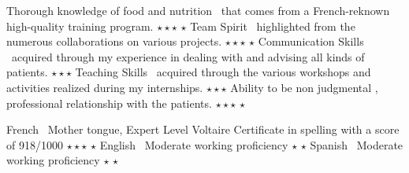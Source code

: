 
\vspace{0.5cm}

\begin{cvhonors}
  \cvhonor
    {Thorough knowledge of food and nutrition}
    {~that comes from a French-reknown high-quality training program.}
    {$\star\star\star$ $\star$}
  \cvhonor
    {Team Spirit}
    {~highlighted from the numerous collaborations on various projects.}
    {$\star\star\star$ $\star$}    
  \cvhonor
    {Communication Skills}
    {~acquired through my experience in dealing with and advising all kinds of patients.}
    {$\star\star\star$}
  \cvhonor
    {Teaching Skills}
    {~acquired through the various workshops and activities realized during my internships.}
    {$\star\star\star$}
  \cvhonor
    {Ability to be non judgmental}
    {, professional relationship with the patients.}
    {$\star\star\star$ $\star$}
\end{cvhonors}

\vspace{0.5cm}

\begin{cvhonors}
  \cvhonor
    {French}
    {~Mother tongue, Expert Level Voltaire Certificate in spelling with a score of 918/1000}
    {$\star\star\star$ $\star$}
  \cvhonor
    {English}
    {~Moderate working proficiency}
    {$\star$ $\star$}
  \cvhonor
    {Spanish}
    {~Moderate working proficiency}
    {$\star$ $\star$}
\end{cvhonors}